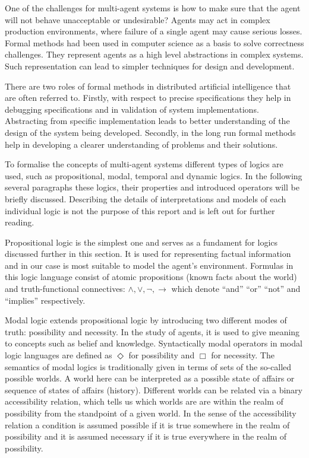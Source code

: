 One of the challenges for multi-agent systems is how to make sure that the agent will not behave unacceptable or undesirable? Agents may act in complex production environments, where failure of a single agent may cause serious losses. Formal methods had been used in computer science as a basis to solve correctness challenges. They represent agents as a high level abstractions in complex systems. Such representation can lead to simpler techniques for design and development.

There are two roles of formal methods in distributed artificial intelligence that are often referred to. Firstly, with respect to precise specifications they help in debugging specifications and in validation of system implementations. Abstracting from specific implementation leads to better understanding of the design of the system being developed. Secondly, in the long run formal methods help in developing a clearer understanding of problems and their solutions. \cite{Singh_99}

To formalise the concepts of multi-agent systems different types of logics are used, such as propositional, modal, temporal and dynamic logics. In the following several paragraphs these logics, their properties and introduced operators will be briefly discussed. Describing the details of interpretations and models of each individual logic is not the purpose of this report and is left out for further reading.

Propositional logic is the simplest one and serves as a fundament for logics discussed further in this section. It is used for representing factual information and in our case is most suitable to model the agent's environment. Formulas in this logic language consist of atomic propositions (known facts about the world) and truth-functional connectives: $\land,\lor,\neg,\rightarrow$ which denote ``and'' ``or'' ``not'' and ``implies'' respectively. \cite{Enderton_72}

Modal logic extends propositional logic by introducing two different modes of truth: possibility and necessity. In the study of agents, it is used to give
meaning to concepts such as belief and knowledge. Syntactically modal operators in modal logic languages are defined as $\Diamond$  for possibility and
$\Box$ for necessity. The semantics of modal logics is traditionally given in terms of sets of the so-called possible worlds. A world here can be interpreted as a possible state of affairs or sequence of states of affairs (history). Different worlds can be related via a binary accessibility relation, which tells us which worlds are are within the realm of possibility from the standpoint of a given world. In the sense of the accessibility relation a condition is assumed possible if it is true somewhere in the realm of possibility and it is assumed necessary if it is true everywhere in the realm of possibility. \cite{Saul_63}


